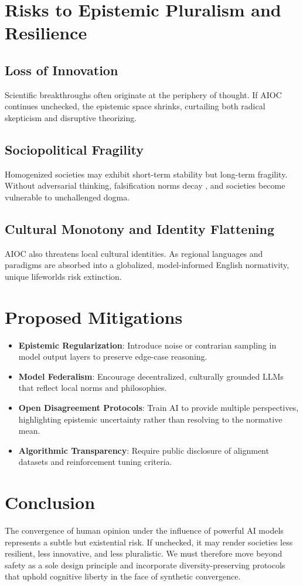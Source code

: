 \documentclass[11pt]{article}
\begin{document}
\section{Risks to Epistemic Pluralism and Resilience}
\subsection{Loss of Innovation}
Scientific breakthroughs often originate at the periphery of thought. If AIOC continues unchecked, the epistemic space shrinks, curtailing both radical skepticism and disruptive theorizing.

\subsection{Sociopolitical Fragility}
Homogenized societies may exhibit short-term stability but long-term fragility. Without adversarial thinking, falsification norms decay \cite{popper2005logic}, and societies become vulnerable to unchallenged dogma.

\subsection{Cultural Monotony and Identity Flattening}
AIOC also threatens local cultural identities. As regional languages and paradigms are absorbed into a globalized, model-informed English normativity, unique lifeworlds risk extinction.

\section{Proposed Mitigations}
\begin{itemize}
  \item \textbf{Epistemic Regularization}: Introduce noise or contrarian sampling in model output layers to preserve edge-case reasoning.
  \item \textbf{Model Federalism}: Encourage decentralized, culturally grounded LLMs that reflect local norms and philosophies.
  \item \textbf{Open Disagreement Protocols}: Train AI to provide multiple perspectives, highlighting epistemic uncertainty rather than resolving to the normative mean.
  \item \textbf{Algorithmic Transparency}: Require public disclosure of alignment datasets and reinforcement tuning criteria.
\end{itemize}

\section{Conclusion}
The convergence of human opinion under the influence of powerful AI models represents a subtle but existential risk. If unchecked, it may render societies less resilient, less innovative, and less pluralistic. We must therefore move beyond safety as a sole design principle and incorporate diversity-preserving protocols that uphold cognitive liberty in the face of synthetic convergence.
\end{document}
